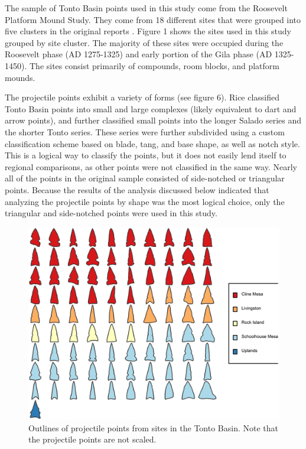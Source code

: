 \documentclass[a4paper]{article}
\begin{document}
The sample of Tonto Basin points used in this study come from the Roosevelt Platform Mound Study. They come from 18 different sites that were grouped into five clusters in the original reports \autocite[see][ for an overview]{Rice1998-ku}. Figure 1 shows the sites used in this study grouped by site cluster. The majority of these sites were occupied during the Roosevelt phase (AD 1275-1325) and early portion of the Gila phase (AD 1325-1450). The sites consist primarily of compounds, room blocks, and platform mounds.

The projectile points exhibit a variety of forms (see figure 6). Rice \autocite*{Rice1994-rk} classified Tonto Basin points into small and large complexes (likely equivalent to dart and arrow points), and further classified small points into the longer Salado series and the shorter Tonto series. These series were further subdivided using a custom classification scheme based on blade, tang, and base shape, as well as notch style. This is a logical way to classify the points, but it does not easily lend itself to regional comparisons, as other points were not classified in the same way. Nearly all of the points in the original sample consisted of side-notched or triangular points. Because the results of the analysis discussed below indicated that analyzing the projectile points by shape was the most logical choice, only the triangular and side-notched points were used in this study.

\begin{figure}
\includegraphics[width=1\linewidth]{figures/TontoPointsFinal} \caption{Outlines of projectile points from sites in the Tonto Basin. Note that the projectile points are not scaled.}\label{fig:TontoPointsFinal}
\end{figure}
\end{document}
